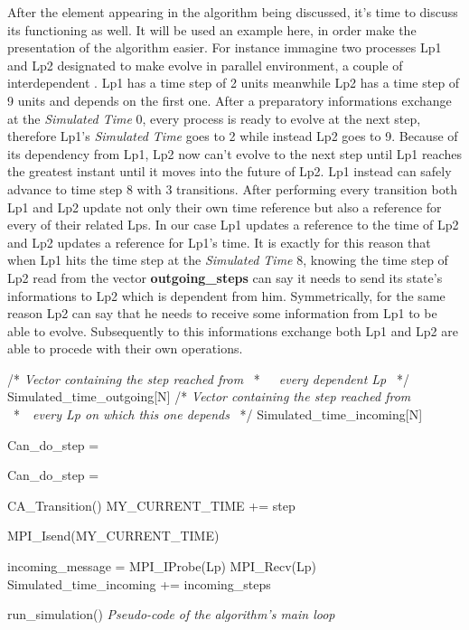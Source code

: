 \documentclass[12pt,a4paper,fleqn]{report}
\begin{document}
After the element appearing in the algorithm being discussed, it's time to discuss its functioning as well. It will be used an example here, in order make the presentation of the algorithm easier. For instance immagine two processes Lp1 and Lp2 designated to make evolve in parallel environment, a couple of interdependent . Lp1 has a time step of 2 units meanwhile Lp2 has a time step of 9 units and depends on the first one. After a preparatory informations exchange at the \textit{Simulated Time} 0, every process is ready to evolve at the next step, therefore Lp1's \textit{Simulated Time} goes to 2 while instead Lp2 goes to 9. Because of its dependency from Lp1, Lp2 now can't evolve to the next step until Lp1 reaches the greatest instant until it moves into the future of Lp2. Lp1 instead can safely advance to time step 8 with 3 transitions. After performing every transition both Lp1 and Lp2 update not only their own time reference but also a reference for every of their related Lps. In our case Lp1 updates a reference to the time of Lp2 and Lp2 updates a reference for Lp1's time. It is exactly for this reason that when Lp1 hits the time step at the \textit{Simulated Time} 8, knowing the time step of Lp2 read from the vector \textbf{outgoing\_steps} can say it needs to send its state's informations to Lp2 which is dependent from him. Symmetrically, for the same reason Lp2 can say that he needs to receive some information from Lp1 to be able to evolve. Subsequently to this informations exchange both Lp1 and Lp2 are able to procede with their own operations.
\begin{algorithm}
\label{alg:one}
\begin{algorithmic}
	\STATE /* \textit{Vector containing the step reached from }
	\STATE\ *\ \ \ \textit{every dependent Lp}
	\STATE\ */
	\STATE Simulated\_time\_outgoing{[N]}
	\STATE /* \textit{Vector containing the step reached from}
	\STATE\ *\ \ \textit{every Lp on which this one depends}
	\STATE\ */
	\STATE Simulated\_time\_incoming{[N]}
	
		\STATE Can\_do\_step = \TRUE
   		
				\STATE Can\_do\_step = \FALSE
			\ENDIF
		\ENDFOR
		
			\STATE CA\_Transition()
			\STATE MY\_CURRENT\_TIME += step
			
				\STATE MPI\_Isend(MY\_CURRENT\_TIME)
			\ENDFOR
		\ENDIF
		
			\STATE incoming\_message = MPI\_IProbe(Lp)
				\STATE MPI\_Recv(Lp)
				\STATE Simulated\_time\_incoming += incoming\_steps
			\ENDIF
		\ENDFOR
		 
 	 \ENDWHILE
 	 
\end{algorithmic}
\caption{run\_simulation() \textit{Pseudo-code of the algorithm's main loop}}
\end{algorithm}
\end{document}
